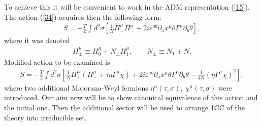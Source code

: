 \documentclass[a4paper]{article}
\begin{document}
To achieve this it will be convenient to work in the ADM 
representation (\ref{15}). The action (\ref{34}) acquires then the 
following form:
\begin{eqnarray}\label{42}
S=-\frac{T}{2}\int d^2\sigma
\left[\frac{1}{N}
\Pi_+^\mu \Pi_-^\mu+2i\varepsilon^{ab}\partial_ax^\mu
\theta\Gamma^\mu\partial_b\theta\right],
\end{eqnarray}
where it was denoted 
\begin{eqnarray}\label{43}
\Pi^\mu_{\pm}\equiv\Pi_0^\mu+N_{\pm}\Pi_1^\mu, \qquad 
N_{\pm}\equiv N_1\pm N.
\end{eqnarray}
Modified action to be examined is
\begin{eqnarray}\label{44}
S=-\frac{T}{2}\int d^2\sigma
\left[\frac{1}{N}
\Pi_+^\mu (\Pi_-^\mu+i\eta\Gamma^\mu\chi)+
2i\varepsilon^{ab}\partial_ax^\mu
\theta\Gamma^\mu\partial_b\theta-\frac{1}{4N}
(\eta\Gamma^\mu\chi)^2\right],
\end{eqnarray}
where two additional Majorana-Weyl fermions 
$\eta^\alpha(\tau, \sigma), ~ \chi^\alpha(\tau, \sigma)$ were introduced. 
Our aim now will be to show canonical equivalence of this action and 
the initial one. Then the additional sector will be used to arrange 
1CC of the theory into irreducible set.
\end{document}
